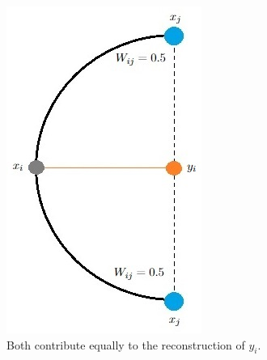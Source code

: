 \begin{figure}[!]
\begin{subfigure}[t]{0.40\textwidth}
         \includegraphics[width=\textwidth]{images/lle_0.5_0.5.jpg}
         \caption{Both contribute equally to the reconstruction of \textcolor{embedding}{$y_i$}.}
         \label{subfig:lle_0.5_0.5}
     \end{subfigure}
     \hfill
     \begin{subfigure}[t]{0.40\textwidth}
         \centering

\end{subfigure}
\end{figure}
